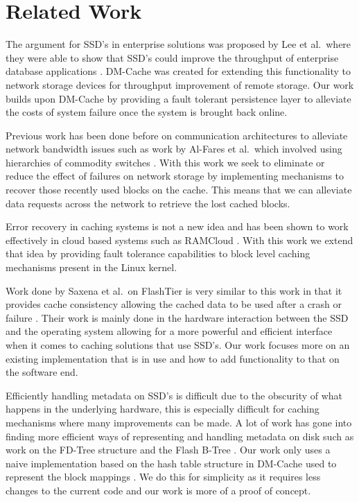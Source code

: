\section{Related Work}
\label{sec:related}

The argument for SSD's in enterprise solutions was proposed by Lee et
al.\ where they were able to show that SSD's could improve the
throughput of enterprise database applications
\cite{EnterpriseSSD}. DM-Cache was created for extending this
functionality to network storage devices for throughput improvement of
remote storage. Our work builds upon DM-Cache by providing a fault
tolerant persistence layer to alleviate the costs of system failure
once the system is brought back online.

Previous work has been done before on communication architectures to
alleviate network bandwidth issues such as work by Al-Fares et al.\
which involved using hierarchies of commodity switches
\cite{Network}. With this work we seek to eliminate or reduce the
effect of failures on network storage by implementing mechanisms to
recover those recently used blocks on the cache. This means that we
can alleviate data requests across the network to retrieve the lost
cached blocks.

Error recovery in caching systems is not a new idea and has been shown
to work effectively in cloud based systems such as RAMCloud
\cite{RAMCloud}. With this work we extend that idea by providing fault
tolerance capabilities to block level caching mechanisms present in
the Linux kernel.

Work done by Saxena et al.\ on FlashTier is very similar to this work
in that it provides cache consistency allowing the cached data to be
used after a crash or failure \cite{flashtier}. Their work is mainly
done in the hardware interaction between the SSD and the operating
system allowing for a more powerful and efficient interface when it
comes to caching solutions that use SSD's. Our work focuses more on an
existing implementation that is in use and how to add functionality to
that on the software end.

Efficiently handling metadata on SSD's is difficult due to the
obscurity of what happens in the underlying hardware, this is
especially difficult for caching mechanisms where many improvements
can be made. A lot of work has gone into finding more efficient ways
of representing and handling metadata on disk such as work on the
FD-Tree structure and the Flash B-Tree \cite{FlashB-Tree,
  FD-Tree}. Our work only uses a naive implementation based on the
hash table structure in DM-Cache used to represent the block mappings
\cite{DM-Cache}. We do this for simplicity as it requires less changes
to the current code and our work is more of a proof of concept.
